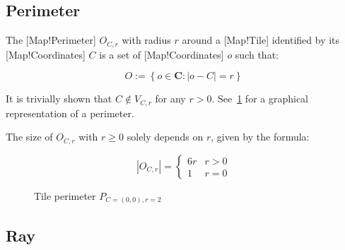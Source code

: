 \subsection{Perimeter}

The [Map!Perimeter] \(O_{C,r}\) with radius \(r\) around a [Map!Tile] identified by its [Map!Coordinates] \(C\) is a set of [Map!Coordinates] \(o\) such that:

\begin{equation}\label{eq:map_peri}
    O := \left \{ o \in \mathbf{C} : |o - C| = r \right \}
\end{equation}

It is trivially shown that \(C \notin V_{C,r}\) for any \(r > 0\).
See~\ref{fig:map_peri} for a graphical representation of a perimeter.

The size of \(O_{C,r}\) with \(r \geq 0\) solely depends on \(r\), given by the formula:

\begin{equation}\label{eq:map_peri_size}
    |O_{C,r}| = \begin{cases}
        6r & r > 0\\
        1 & r = 0
    \end{cases}
\end{equation}

\begin{figure}[htbp]
    \centering
    \caption{Tile perimeter \(P_{C=(0,0),r=2}\)}\label{fig:map_peri}
\end{figure}

\subsection{Ray}

